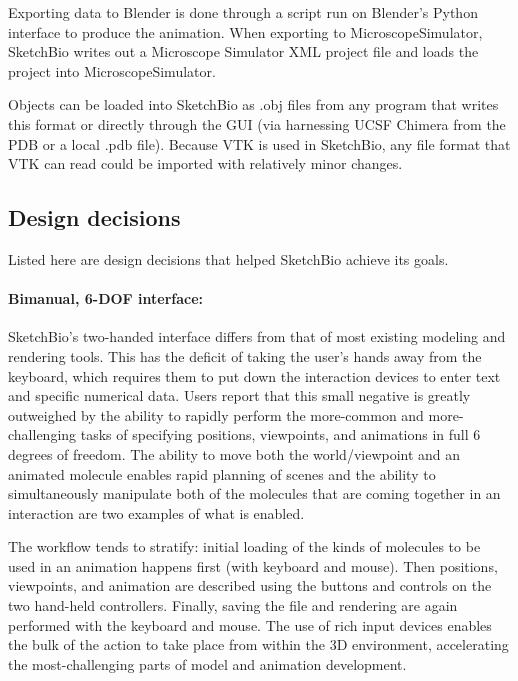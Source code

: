 \documentclass[twocolumn]{bmcart}%
\begin{document}
Exporting data to Blender is done through a script run on Blender's Python interface to produce the animation.
When exporting to MicroscopeSimulator, SketchBio writes out a Microscope Simulator XML project file and loads the project into MicroscopeSimulator.

Objects can be loaded into SketchBio as .obj files from any program that writes this format or directly through the GUI (via harnessing UCSF Chimera from the PDB or a local .pdb file).
Because VTK is used in SketchBio, any file format that VTK can read could be imported with relatively minor changes.

\subsection*{Design decisions}
Listed here are design decisions that helped SketchBio achieve its goals.

\paragraph*{Bimanual, 6-DOF interface:} SketchBio's two-handed interface differs from that of most existing modeling and rendering tools. This has the deficit of taking the user's hands away from the keyboard, which requires them to put down the interaction devices to enter text and specific numerical data. Users report that this small negative is greatly outweighed by the ability to rapidly perform the more-common and more-challenging tasks of specifying positions, viewpoints, and animations in full 6 degrees of freedom. The ability to move both the world/viewpoint and an animated molecule enables rapid planning of scenes and the ability to simultaneously manipulate both of the molecules that are coming together in an interaction are two examples of what is enabled.

The workflow tends to stratify: initial loading of the kinds of molecules to be used in an animation happens first (with keyboard and mouse). Then positions, viewpoints, and animation are described using the buttons and controls on the two hand-held controllers. Finally, saving the file and rendering are again performed with the keyboard and mouse. The use of rich input devices enables the bulk of the action to take place from within the 3D environment, accelerating the most-challenging parts of model and animation development.
\end{document}
